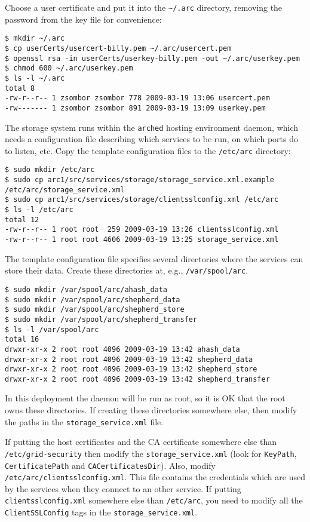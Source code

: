 \documentclass{article}
\begin{document}
Choose a user certificate and put it into the \verb!~/.arc! directory, removing the password from the key file for convenience:

\begin{verbatim}
$ mkdir ~/.arc
$ cp userCerts/usercert-billy.pem ~/.arc/usercert.pem
$ openssl rsa -in userCerts/userkey-billy.pem -out ~/.arc/userkey.pem
$ chmod 600 ~/.arc/userkey.pem
$ ls -l ~/.arc
total 8
-rw-r--r-- 1 zsombor zsombor 778 2009-03-19 13:06 usercert.pem
-rw------- 1 zsombor zsombor 891 2009-03-19 13:09 userkey.pem
\end{verbatim}

The storage system runs within the \verb!arched! hosting environment daemon, which needs a configuration file describing which services to be run, on which ports do to listen, etc.
Copy the template configuration files to the \verb!/etc/arc! directory:

\begin{verbatim}
$ sudo mkdir /etc/arc
$ sudo cp arc1/src/services/storage/storage_service.xml.example /etc/arc/storage_service.xml
$ sudo cp arc1/src/services/storage/clientsslconfig.xml /etc/arc
$ ls -l /etc/arc
total 12
-rw-r--r-- 1 root root  259 2009-03-19 13:26 clientsslconfig.xml
-rw-r--r-- 1 root root 4606 2009-03-19 13:25 storage_service.xml
\end{verbatim}

The template configuration file specifies several directories where the services can store their data. Create these directories at, e.g., \verb!/var/spool/arc!.

\begin{verbatim}
$ sudo mkdir /var/spool/arc/ahash_data
$ sudo mkdir /var/spool/arc/shepherd_data
$ sudo mkdir /var/spool/arc/shepherd_store
$ sudo mkdir /var/spool/arc/shepherd_transfer
$ ls -l /var/spool/arc
total 16
drwxr-xr-x 2 root root 4096 2009-03-19 13:42 ahash_data
drwxr-xr-x 2 root root 4096 2009-03-19 13:42 shepherd_data
drwxr-xr-x 2 root root 4096 2009-03-19 13:42 shepherd_store
drwxr-xr-x 2 root root 4096 2009-03-19 13:42 shepherd_transfer
\end{verbatim}

In this deployment the daemon will be run as root, so it is OK that the root owns these directories. 
If creating these directories somewhere else, then modify the paths in the \verb!storage_service.xml! file.

If putting the host certificates and the CA certificate somewhere else than \verb!/etc/grid-security! then modify the \verb!storage_service.xml! (look for \verb!KeyPath!, \verb!CertificatePath! and \verb!CACertificatesDir!). Also, modify \verb!/etc/arc/clientsslconfig.xml!. This file contains the credentials which are used by the services when they connect to an other service. If putting \verb!clientsslconfig.xml! somewhere else than \verb!/etc/arc!, you need to modify all the \verb!ClientSSLConfig! tags in the \verb!storage_service.xml!.
\end{document}
